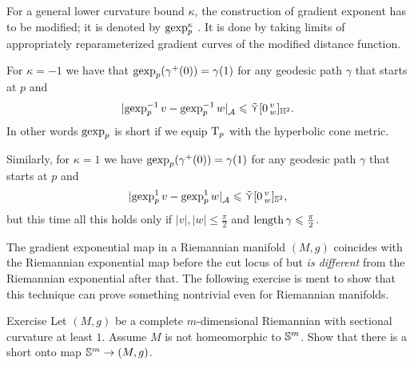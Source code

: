 For a general lower curvature bound $\kappa$, the construction of gradient exponent has to be modified;
it is denoted by $\operatorname{\rm gexp}\nolimits_p^\kappa$ \cite[16.36]{alexander-kapovitch-petrunin2024}. It is done by taking limits of appropriately reparameterized gradient curves of  the modified distance function.

For $\kappa=-1$ we have 
that $\operatorname{\rm gexp}\nolimits_p(\gamma^+(0))=\gamma(1)$
for any geodesic path $\gamma$ that starts at $p$
and 
\[|{\operatorname{\rm gexp}\nolimits_p^{-1}v}-{\operatorname{\rm gexp}\nolimits_p^{-1}w}|_{\mathcal{A}}^{{}}\leqslant \mathop{\tilde\curlyvee}\nolimits[0\,{}^{v}_{w}]_{\mathbb{H}^2}.\]
In other words $\operatorname{\rm gexp}\nolimits_p$ is short if we equip $\mathrm{T}_p$ with the hyperbolic cone metric.

Similarly, for $\kappa=1$ we have $\operatorname{\rm gexp}\nolimits_p(\gamma^+(0))=\gamma(1)$
for any geodesic path $\gamma$ that starts at $p$ and 
\[|{\operatorname{\rm gexp}\nolimits_p^{1}v}-{\operatorname{\rm gexp}\nolimits_p^{1}w}|_{\mathcal{A}}^{{}}\leqslant \mathop{\tilde\curlyvee}\nolimits[0\,{}^{v}_{w}]_{\mathbb{S}^2},\]
but this time all this holds only if $|v|,|w|\le\tfrac\pi2$ and $\mathop{\rm length}\nolimits\gamma\leqslant\tfrac\pi2$.

The gradient exponential map in a Riemannian manifold $(M,g)$ coincides with the Riemannian exponential map before the cut locus of but \textit{is different} from the  Riemannian exponential after that.
The following exercise is ment to show that this technique can prove something nontrivial even for Riemannian manifolds.

\begin{thm}{Exercise}\label{ex:short-onto}
Let $(M,g)$ be a complete $m$-dimensional Riemannian with sectional curvature at least $1$.
Assume $M$ is not homeomorphic to $\mathbb{S}^m$.
Show that there is a short onto map $\mathbb{S}^m\to (M,g)$.
\end{thm}


